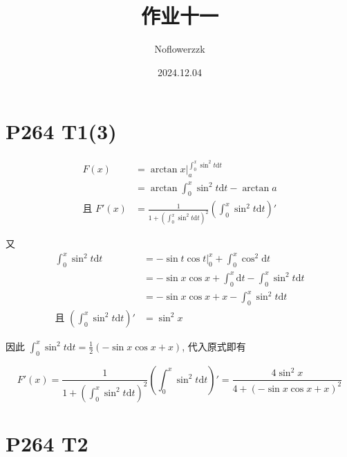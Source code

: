 \documentclass{article}
\title{作业十一}
\author{Noflowerzzk}
\date{2024.12.04}
\newcommand{\dd}{\mathrm{d}}
\newcommand{\dt}{\dd t}
\begin{document}
\maketitle

\section*{P264 T1(3)}

\begin{align*}
    F(x) & = \arctan x \bigg|_a^{\int_{0}^{x}\sin^2 t \dd t} \\
    & = \arctan \int_{0}^{x}\sin^2 t \dd t - \arctan a \\
    \text{且  } F'(x) &= \frac{1}{1 + \left(\int_{0}^{x}\sin^2 t \dt\right)^2}\left(\int_{0}^{x}\sin^2 t \dt\right)'
\end{align*}

又 
\begin{align*}
    \int_{0}^{x}\sin^2 t \dt &= -\sin t \cos t \bigg|_0^x + \int_{0}^{x}\cos^2 \dt \\
    &= -\sin x \cos x + \int_0^x \dt - \int_{0}^{x} \sin^2 t \dt\\
    &= -\sin x \cos x + x - \int_{0}^{x}\sin^2 t \dt \\
    \text{且  } \left(\int_{0}^{x}\sin^2 t \dt\right)' &= \sin^2 x
\end{align*}

因此 $\int_{0}^{x}\sin^2 t \dt = \frac{1}{2}\left(-\sin x \cos x + x\right)$, 代入原式即有

\[
    F'(x) = \frac{1}{1 + \left(\int_{0}^{x}\sin^2 t \dt\right)^2}\left(\int_{0}^{x}\sin^2 t \dt\right)' = \frac{4\sin^2 x}{4 + \left(-\sin x \cos x + x\right)^2}
\]

\section*{P264 T2}
\end{document}

